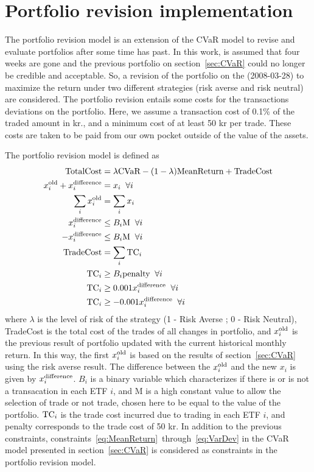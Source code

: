 \section{Portfolio revision implementation}
The portfolio revision model is an extension of the CVaR model to revise and evaluate portfolios after some time has past.
In this work, is assumed that four weeks are gone and the previous portfolio on section~\ref{sec:CVaR} could no longer be credible and acceptable.
So, a revision of the portfolio on the (2008-03-28) to maximize the return under two different strategies (risk averse and risk neutral) are considered.
The portfolio revision entails some costs for the transactions deviations on the portfolio.
Here, we assume a transaction cost of 0.1\% of the traded amount in kr., and a minimum cost of at least 50 kr per trade.
These costs are taken to be paid from our own pocket outside of the value of the assets.

The portfolio revision model is defined as
\begin{align}
\textup{TotalCost} &= \lambda \textup{CVaR} - {\left( 1 - \lambda \right)} \textup{MeanReturn} + \textup{TradeCost} \\
x^{\textup{old}}_{i} + x^{\textup{difference}}_{i} &= x_{i} \; \; \forall i \\
\sum_{i} x^{\textup{old}}_{i} &= \sum_{i} x_{i} \\
x^{\textup{difference}}_{i} &\le B_{i} \textup{M} \; \; \forall i \\
-x^{\textup{difference}}_{i} &\le B_{i} \textup{M} \; \; \forall i \\
\textup{TradeCost} &= \sum_{i} \textup{TC}_{i} \\
\textup{TC}_{i} &\ge B_{i} \textup{penalty} \; \; \forall i \\
\textup{TC}_{i} &\ge 0.001 x^{\textup{difference}}_{i} \; \; \forall i \\
\textup{TC}_{i} &\ge - 0.001 x^{\textup{difference}}_{i} \; \; \forall i \\
\end{align}
where $\lambda$ is the level of risk of the strategy (1 - Risk Averse ; 0 - Risk Neutral), TradeCost is the total cost of the trades of all changes in portfolio, and $x^{\textup{old}}_{i}$ is the previous result of portfolio updated with the current historical monthly return.
In this way, the first $x^{\textup{old}}_{i}$ is based on the results of section~\ref{sec:CVaR} using the risk averse result.
The difference between the $x^{\textup{old}}_{i}$ and the new $x_{i}$ is given by $x^{\textup{difference}}_{i}$.
$B_{i}$ is a binary variable which characterizes if there is or is not a transacation in each ETF $i$, and M is a high constant value to allow the selection of trade or not trade, chosen here to be equal to the value of the portfolio.
$\textup{TC}_{i}$ is the trade cost incurred due to trading in each ETF $i$, and penalty corresponds to the trade cost of 50 kr.
In addition to the previous constraints, constraints~\eqref{eq:MeanReturn}~through~\eqref{eq:VarDev} in the CVaR model presented in section~\ref{sec:CVaR} is considered as constraints in the portfolio revision model.

